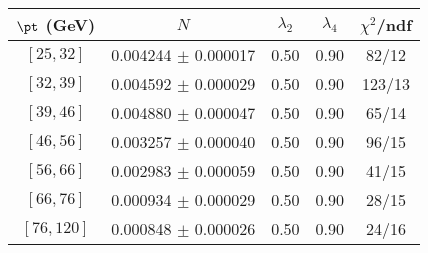 \begin{tabular}{c||c|c|c|c}
$\pt$ (GeV) & $N$ & $\lambda_{2}$ & $\lambda_4$  & $\chi^2$/ndf  \\
\hline
$[25, 32]$ & 0.004244 $\pm$ 0.000017 & 0.50 & 0.90 & 82/12\\
$[32, 39]$ & 0.004592 $\pm$ 0.000029 & 0.50 & 0.90 & 123/13\\
$[39, 46]$ & 0.004880 $\pm$ 0.000047 & 0.50 & 0.90 & 65/14\\
$[46, 56]$ & 0.003257 $\pm$ 0.000040 & 0.50 & 0.90 & 96/15\\
$[56, 66]$ & 0.002983 $\pm$ 0.000059 & 0.50 & 0.90 & 41/15\\
$[66, 76]$ & 0.000934 $\pm$ 0.000029 & 0.50 & 0.90 & 28/15\\
$[76, 120]$ & 0.000848 $\pm$ 0.000026 & 0.50 & 0.90 & 24/16\\
\end{tabular}
